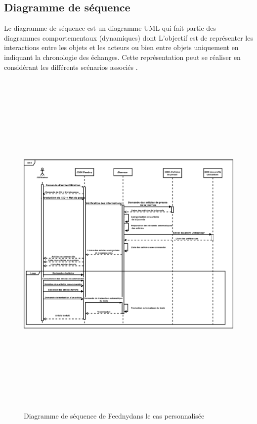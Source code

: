 \subsection{Diagramme de séquence}
Le diagramme de séquence est un diagramme UML qui fait partie des diagrammes comportementaux (dynamiques) dont L'objectif est de représenter les interactions entre les objets et les acteurs ou bien entre objets uniquement en indiquant la chronologie des échanges. Cette représentation peut se réaliser en considérant les différents scénarios associés \cite{UML}.
\begin{figure}[H]
    \centering
    \includegraphics[height=500pt,width=425pt]{img/chapter3/diagseqperso.png}
    \caption{Diagramme de séquence de \textquotedbl Feedny\textquotedbl dans le cas personnalisée }
\end{figure}

